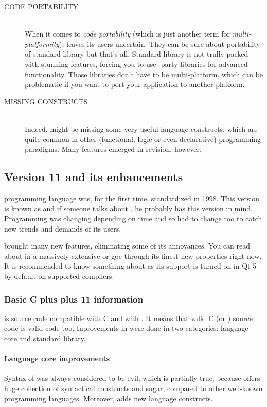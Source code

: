\begin{description}
\item[CODE PORTABILITY\ts{\textcolor{red}{bad}}]\hfill \\
When it comes to \textit{code portability} (which is just another term for \textit{multi-platformity}), \cpp{} leaves its users uncertain. They can be sure about portability of \cpp{} standard library but that's all. Standard library is not trully packed with stunning features, forcing you to use -party libraries for advanced functionality. Those libraries don't have to be multi-platform, which can be problematic if you want to port your application to another platform.

\item[MISSING CONSTRUCTS\ts{\textcolor{red}{bad}}]\hfill \\
Indeed, \cpp{} might be missing some very useful language constructs, which are quite common in other (\eg functional, logic or even declarative) programming paradigms. Many features emerged in  revision, however.
\end{description}

\vfill

\subsection{Version 11 and its enhancements}
\cpp{} programming language was, for the first time, standardized in 1998. This version is known as  and if someone talks about \cpp, he probably has this version in mind. Programming was changing depending on time and so \cpp{} had to change too to catch new trends and demands of its users.

 brought many new features, eliminating some of its annoyances. You can read about  in a massively extensive \citep{various:cppstandard} or goe through its finest new properties right now. It is recommended to know something about  as its support is turned on in Qt 5 by default on supported compilers.

\subsubsection{Basic C plus plus 11 information}
 is source code compatible with C and with . It means that valid C (or ) source code is valid  code too. Inprovements in \cpp{} were done in two categories: language core and standard library.

\paragraph{Language core improvements}
Syntax of \cpp{} was always considered to be evil, which is partially true, because \cpp{} offers huge collection of syntactical constructs and sugar, compared to other well-known programming languages. Moreover,  adds new language constructs.

